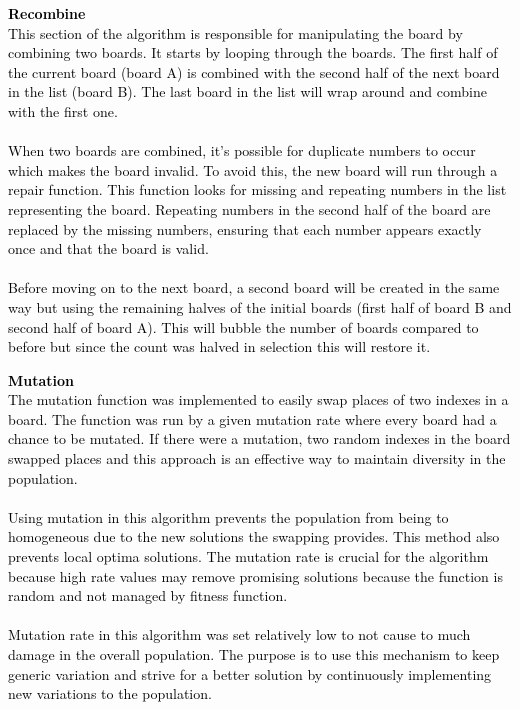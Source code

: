 \documentclass{scrartcl}
\begin{document}
\textcolor{black}{\textbf{Recombine \\} This section of the algorithm is responsible for manipulating the board by combining two boards. It starts by looping through the boards. The first half of the current board (board A) is combined with the second half of the next board in the list (board B). The last board in the list will wrap around and combine with the first one. \\ \\ When two boards are combined, it’s possible for duplicate numbers to occur which makes the board invalid. To avoid this, the new board will run through a repair function. This function looks for missing and repeating numbers in the list representing the board. Repeating numbers in the second half of the board are replaced by the missing numbers, ensuring that each number appears exactly once and that the board is valid. \\ \\ Before moving on to the next board, a second board will be created in the same way but using the remaining halves of the initial boards (first half of board B and second half of board A). This will bubble the number of boards compared to before but since the count was halved in selection this will restore it.}

\textcolor{black}{\textbf{Mutation \\} The mutation function was implemented to easily swap places of two indexes in a board. The function was run by a given mutation rate where every board had a chance to be mutated. If there were a mutation, two random indexes in the board swapped places and this approach is an effective way to maintain diversity in the population. \\ \\ Using mutation in this algorithm prevents the population from being to homogeneous due to the new solutions the swapping provides.  This method also prevents local optima solutions. The mutation rate is crucial for the algorithm because high rate values may remove promising solutions because the function is random and not managed by fitness function. \\ \\ Mutation rate in this algorithm was set relatively low to not cause to much damage in the overall population. The purpose is to use this mechanism to keep generic variation and strive for a better solution by continuously implementing new variations to the population.}
\end{document}
